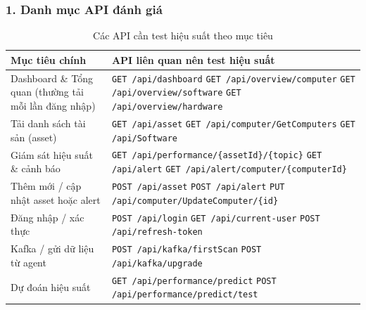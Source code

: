 \subsubsection*{1. Danh mục API đánh giá}
\begin{table}[H]
    \centering
    \caption{Các API cần test hiệu suất theo mục tiêu}
    \begin{tabular}{|>{\raggedright\arraybackslash}p{6cm}|>{\raggedright\arraybackslash}p{8cm}|}
        \hline
        \textbf{Mục tiêu chính} & \textbf{API liên quan nên test hiệu suất} \\
        \hline
        Dashboard \& Tổng quan (thường tải mỗi lần đăng nhập) & 
        \texttt{GET /api/dashboard}\newline
        \texttt{GET /api/overview/computer}\newline
        \texttt{GET /api/overview/software}\newline
        \texttt{GET /api/overview/hardware} \\
        \hline
        Tải danh sách tài sản (asset) & 
        \texttt{GET /api/asset}\newline
        \texttt{GET /api/computer/GetComputers}\newline
        \texttt{GET /api/Software} \\
        \hline
        Giám sát hiệu suất \& cảnh báo & 
        \texttt{GET /api/performance/\{assetId\}/\{topic\}}\newline
        \texttt{GET /api/alert}\newline
        \texttt{GET /api/alert/computer/\{computerId\}} \\
        \hline
        Thêm mới / cập nhật asset hoặc alert & 
        \texttt{POST /api/asset}\newline
        \texttt{POST /api/alert}\newline
        \texttt{PUT /api/computer/UpdateComputer/\{id\}} \\
        \hline
        Đăng nhập / xác thực & 
        \texttt{POST /api/login}\newline
        \texttt{GET /api/current-user}\newline
        \texttt{POST /api/refresh-token} \\
        \hline
        Kafka / gửi dữ liệu từ agent & 
        \texttt{POST /api/kafka/firstScan}\newline
        \texttt{POST /api/kafka/upgrade} \\
        \hline
        Dự đoán hiệu suất & 
        \texttt{GET /api/performance/predict}\newline
        \texttt{POST /api/performance/predict/test} \\
        \hline
    \end{tabular}
    
\end{table}

